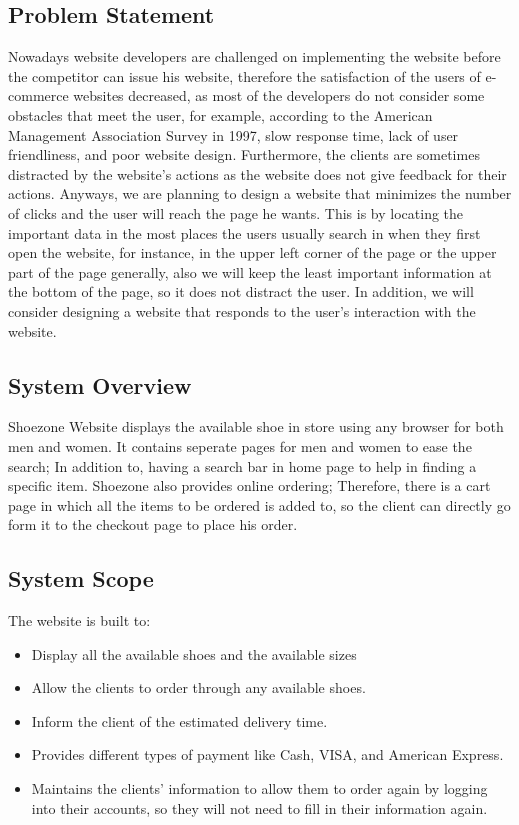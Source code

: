 \documentclass[12pt]{article}
\begin{document}
\subsection{Problem Statement}
Nowadays website developers are challenged on implementing the website before the competitor can issue his website, therefore the satisfaction of the users of e-commerce websites decreased, as most of the developers do not consider some obstacles that meet the user, for example, according to the American Management Association Survey in 1997, slow response time, lack of user friendliness, and poor website design. Furthermore, the clients are sometimes distracted by the website’s actions as the website does not give feedback for their actions. 
Anyways, we are planning to design a website that minimizes the number of clicks and the user will reach the page he wants. This is by locating the important data in the most places the users usually search in when they first open the website, for instance, in the upper left corner of the page or the upper part of the page generally, also we will keep the least important information at the bottom of the page, so it does not distract the user. In addition, we will consider designing a website that responds to the user’s interaction with the website. 


\subsection{System Overview}
Shoezone Website displays the available shoe in store using any browser for both men and women. It contains seperate pages for men and women to ease the search; In addition to, having a search bar in home page to help in finding a specific item. Shoezone also provides online ordering; Therefore, there is a cart page in which all the items to be ordered is added to, so the client can directly go form it to the checkout page to place his order.   

\subsection{System Scope}
The website is built to:
\begin{itemize}
 \item Display all the available shoes and the available sizes
 \item Allow the clients to order through any available shoes.
 \item Inform the client of the estimated delivery time.
 \item Provides different types of payment like Cash, VISA, and American Express.   
 \item Maintains the clients' information to allow them to order again by logging into their accounts, so they will not need to fill in their information again.
\end{itemize}
\end{document}
